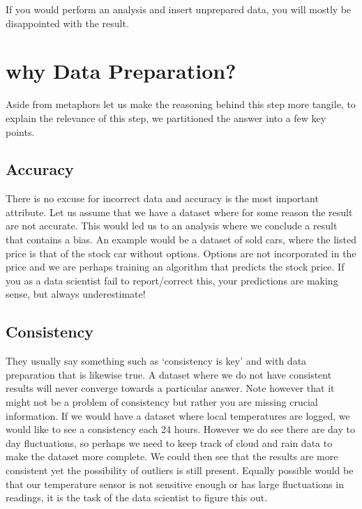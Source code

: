 \documentclass[letterpaper,10pt,english]{jupyterBook}
\begin{document}
\sphinxAtStartPar
If you would perform an analysis and insert unprepared data, you will mostly be disappointed with the result.


\section{why Data Preparation?}
\label{\detokenize{c2_data_preparation/introduction:why-data-preparation}}
\sphinxAtStartPar
Aside from metaphors let us make the reasoning behind this step more tangile, to explain the relevance of this step, we partitioned the answer into a few key points.


\subsection{Accuracy}
\label{\detokenize{c2_data_preparation/introduction:accuracy}}
\sphinxAtStartPar
There is no excuse for incorrect data and accuracy is the most important attribute.
Let us assume that we have a dataset where for some reason the result are not accurate.
This would led us to an analysis where we conclude a result that contains a bias.
An example would be a dataset of sold cars, where the listed price is that of the stock car without options.
Options are not incorporated in the price and we are perhaps training an algorithm that predicts the stock price.
If you as a data scientist fail to report/correct this, your predictions are making sense, but always underestimate!


\subsection{Consistency}
\label{\detokenize{c2_data_preparation/introduction:consistency}}
\sphinxAtStartPar
They usually say something such as ‘consistency is key’ and with data preparation that is likewise true.
A dataset where we do not have consistent results will never converge towards a particular answer.
Note however that it might not be a problem of consistency but rather you are missing crucial information.
If we would have a dataset where local temperatures are logged, we would like to see a consistency each 24 hours.
However we do see there are day to day fluctuations, so perhaps we need to keep track of cloud and rain data to make the dataset more complete.
We could then see that the results are more consistent yet the possibility of outliers is still present.
Equally possible would be that our temperature sensor is not sensitive enough or has large fluctuations in readings, it is the task of the data scientist to figure this out.
\end{document}
